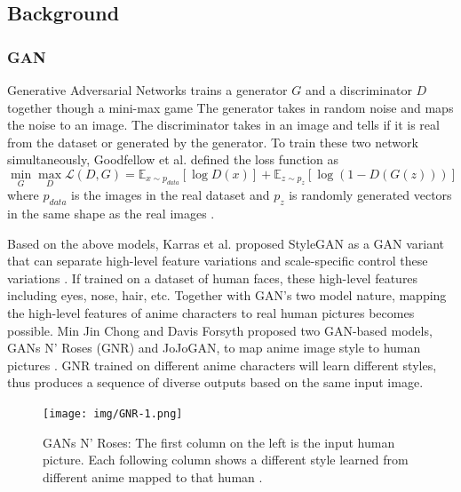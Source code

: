\subsection*{Background}

\subsubsection*{GAN}

Generative Adversarial Networks trains a generator $G$ and a discriminator $D$ together though a mini-max game
The generator takes in random noise and maps the noise to an image.
The discriminator takes in an image and tells if it is real from the dataset or generated by the generator.
To train these two network simultaneously, Goodfellow et al. defined the loss function as 
$$
\min_G\max_{D}\mathcal{L}(D, G) = 
\mathbb{E}_{x \sim p_{data}}[\log D(x)] + 
\mathbb{E}_{z \sim p_z}[\log (1 - D(G(z)))]
$$
where $p_{data}$ is the images in the real dataset
and $p_z$ is randomly generated vectors in the same shape as the real images \cite{Goodfellow2020Generative}.

\par
Based on the above models, Karras et al. proposed StyleGAN as 
a GAN variant that can separate high-level feature variations and scale-specific control these variations \cite{Karras2019Style}.
If trained on a dataset of human faces, these high-level features including eyes, nose, hair, etc.
Together with GAN's two model nature, mapping the high-level features of anime characters to real human pictures becomes possible.
Min Jin Chong and Davis Forsyth proposed two GAN-based models,
GANs N' Roses (GNR) and JoJoGAN,
to map anime image style to human pictures \cite{chong2021gans,chong2021jojogan}.
GNR trained on different anime characters will learn different styles,
thus produces a sequence of diverse outputs based on the same input image.
\begin{figure}[h]
    \texttt{[image: img/GNR-1.png]}
    \caption{
        GANs N' Roses: The first column on the left is the input human picture.
        Each following column shows a different style learned from different anime mapped to that human \cite{chong2021gans}.
    }
\end{figure}

